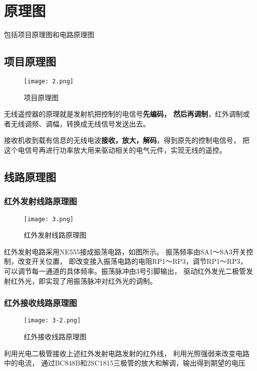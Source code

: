 \chapter{原理图}
\label{cha:china}
包括项目原理图和电路原理图

\section{项目原理图}
\begin{figure}[H] %
  \centering
  \texttt{[image: 2.png]}
  \caption{项目原理图}
  \label{fig:xfig1}
\end{figure}
无线遥控器的原理就是发射机把控制的电信号\textbf{先编码，
然后再调制}，红外调制或者无线调频、调幅，转换成无线信号发送出去。

接收机收到载有信息的无线电波\textbf{接收，放大，解码}，得到原先的控制电信号，
把这个电信号再进行功率放大用来驱动相关的电气元件，实现无线的遥控。


\section{线路原理图}
\subsection{红外发射线路原理图}
\begin{figure}[H] %
  \centering
  \texttt{[image: 3.png]}
  \caption{红外发射线路原理图}
  \label{fig:xfig1}
\end{figure}
红外发射电路采用NE555接成振荡电路，如图所示。
振荡频率由SA1～SA3开关控制，改变开关位置，
即改变接入振荡电路的电阻RP1～RP3，调节RP1～RP3，
可以调节每一通道的具体频率。振荡脉冲由3号引脚输出，
驱动红外发光二极管发射红外光，即实现了用振荡脉冲对红外光的调制。

\subsection{红外接收线路原理图}
\begin{figure}[H] %
  \centering
  \texttt{[image: 3-2.png]}
  \caption{红外接收线路原理图}
  \label{fig:xfig1}
\end{figure}
利用光电二极管接收上述红外发射电路发射的红外线，
利用光照强弱来改变电路中的电流，
通过BC848B和2SC1815三极管的放大和解调，输出得到期望的电压
